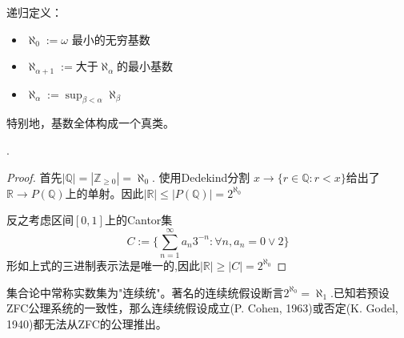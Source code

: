     递归定义：
    \begin{itemize}
        \item $\aleph_0:=\omega$ 最小的无穷基数
        \item $\aleph_{\alpha+1}:=$大于$\aleph_{\alpha}$的最小基数
        \item $\aleph_{\alpha}:=\sup_{\beta <\alpha} \aleph_{\beta}$
    \end{itemize}
    特别地，基数全体构成一个真类。
\begin{Exap}[$|\mathbb{R}|=2^{\aleph_0}$ Cantor].
    \begin{proof}
        首先$|\mathbb{Q}|=|\mathbb{Z}_{\geq 0}|=\aleph_0$. 使用Dedekind分割 $x\rightarrow \{r\in \mathbb{Q}:r<x\}$给出了$\mathbb{R}\rightarrow P(\mathbb{Q})$上的单射。因此$|\mathbb{R}|\leq |P(\mathbb{Q})|=2^{\aleph_0}$

        反之考虑区间$[0,1]$上的Cantor集
        $$C:=\{\sum^{\infty}_{n=1}{a_n 3^{-n}}:\forall n,a_n=0 \vee 2\}$$
        形如上式的三进制表示法是唯一的,因此$|\mathbb{R}|\geq |C|=2^{\aleph_0}$
    \end{proof}
\end{Exap}

集合论中常称实数集为"连续统"。著名的连续统假设断言$2^{\aleph_0}=\aleph_1$.已知若预设ZFC公理系统的一致性，那么连续统假设成立(P. Cohen, 1963)或否定(K. Godel, 1940)都无法从ZFC的公理推出。

